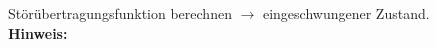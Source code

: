 \begin{question}[section=4,name={Störübertragungsfunktion},difficulty=,type=mdl,tags={}]
	Störübertragungsfunktion berechnen $\rightarrow$ eingeschwungener Zustand.
	\\ \textbf{Hinweis:}\\
	
\end{question}
\begin{solution}
	
\end{solution}